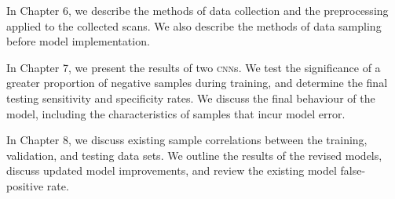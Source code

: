 In Chapter 6, we describe the methods of data collection and the preprocessing applied to the collected scans. We also describe the methods of data sampling before model implementation.

In Chapter 7, we present the results of two \textsc{cnn}s. We test the significance of a greater proportion of negative samples during training, and determine the final testing sensitivity and specificity rates. We discuss the final behaviour of the model, including the characteristics of samples that incur model error.

In Chapter 8, we discuss existing sample correlations between the training, validation, and testing data sets. We outline the results of the revised models, discuss updated model improvements, and review the existing model false-positive rate.



%
%